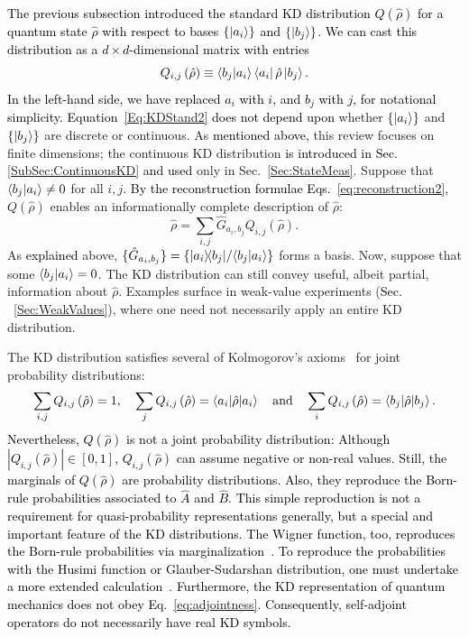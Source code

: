 \documentclass[%
 reprint,
superscriptaddress,
nofootinbib,
bibnotes,
 amsmath,amssymb,
 aps,
]{revtex4-1}
\theoremstyle{plain}
\newcommand*{\ketbra}[2]{\lvert #1 \rangle\!\langle #2 \rvert}
\newcommand{\Dave}[1]{\textcolor{black}{#1} }
\newcommand{\Stephan}[1]{\textcolor{black}{#1} }
\newcommand{\nicole}[1]{\textcolor{black}{#1} }
\begin{document}
\nicole{The previous subsection introduced the standard KD distribution $Q(\hat{\rho})$ for a quantum state  $\hat{\rho}$ with respect to bases $ \{ \ket{a_i} \} $ and $ \{ \ket{b_j} \}$. We can cast this distribution as a $d \times d$-dimensional matrix with entries}
\begin{equation}
\label{Eq:KDStand2}
   Q_{i,j} \left( \hat{\rho} \right) 
   \equiv  \braket{b_j | a_i } \bra{a_i} \hat{\rho} \ket{b_j} .
\end{equation}
\nicole{In the left-hand side, we have replaced $a_i$ with $i$, and $b_j$ with $j$, for notational simplicity. Equation~\eqref{Eq:KDStand2} does not depend upon
}
whether $ \{ \ket{a_i} \} $ and $ \{ \ket{b_j} \}$ are discrete or continuous.  As 
\nicole{mentioned above,} this review focuses on finite dimensions; the continuous KD distribution \Dave{is introduced in Sec. \ref{SubSec:ContinuousKD} and used} only in Sec.~\ref{Sec:StateMeas}.  Suppose that $\braket{b_j|a_i} \neq 0$ for all $i,j$. 
\Stephan{By the reconstruction formulae Eqs.~\eqref{eq:reconstruction2},} $Q(\hat{\rho})$ enables an informationally complete description of $\hat{\rho}$:
\begin{equation}
\label{Eq:StateDecom}
\hat{\rho} = \sum_{i,j} \hat{G}_{a_i,b_j}  Q_{i,j} \left( \hat{\rho} \right)  .
\end{equation}
As \Stephan{explained} above,  $\{ \hat{G}_{a_i,b_j} \} =  \{ {\ketbra{a_i}{b_j}} / {\braket{b_j|a_i}} \} $ forms a  basis.  
Now, suppose that some $\braket{b_j|a_i} = 0$. The KD distribution can still convey useful, albeit partial, information about $\hat{\rho}$. Examples surface in
weak-value experiments 
(\nicole{Sec.}~\ref{Sec:WeakValues}), where
one need not necessarily apply an entire KD distribution.


The KD distribution satisfies several of Kolmogorov's axioms~\cite{Kolmogorov33} for joint probability distributions:
\begin{align}
\label{Eq:KDProps}
\sum_{i,j} Q_{i,j} \left( \hat{\rho} \right)  =1 , \quad \sum_j Q_{i,j} \left( \hat{\rho} \right)  = \braket{a_i | \hat{\rho} | a_i}  \quad \text{and} \quad  \sum_i Q_{i,j} \left( \hat{\rho} \right) = \braket{b_j | \hat{\rho} | b_j} .
\end{align}
\Stephan{
Nevertheless, $Q(\hat \rho)$ is not a joint probability distribution:  Although 
$| Q_{i,j} \left( \hat{\rho} \right) | \in [0,1]$, 
$Q_{i,j} \left( \hat{\rho} \right) $ can assume negative or non-real values.  Still, the marginals of $Q(\hat\rho)$ are probability distributions. Also, they reproduce the Born-rule probabilities associated to $\hat A$ and $\hat B$. 
This simple reproduction is not a requirement for quasi-probability representations generally, but a special and important feature of the KD distributions. 
\nicole{The Wigner function, too, reproduces the Born-rule probabilities via marginalization~\cite{Wigner32}. To reproduce the probabilities with the Husimi function or Glauber-Sudarshan distribution, one must undertake a more extended calculation~\cite{Glauber63, Sudarshan63,Husimi40}.}
\nicole{Furthermore, the KD representation of quantum mechanics does not obey Eq.~\eqref{eq:adjointness}. Consequently, self-adjoint operators do not necessarily have real KD symbols.}
}
\end{document}
